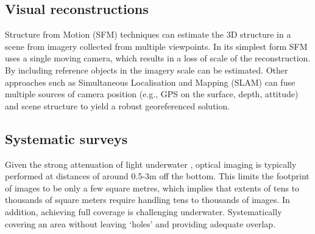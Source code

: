 \subsection{Visual reconstructions}
Structure from Motion (SFM) techniques \cite{Hartley_2004} can estimate the 3D structure in a scene from imagery collected from multiple viewpoints. In its simplest form SFM uses a single moving camera, which results in a loss of scale of the reconstruction. By including reference objects in the imagery scale can be estimated.
Other approaches such as Simultaneous Localisation and Mapping (SLAM) \cite{Thrun_2008} can fuse multiple sources of camera position (e.g., GPS on the surface, depth, attitude) and scene structure to yield a robust georeferenced solution.

\subsection{Systematic surveys}
Given the strong attenuation of light underwater \cite{DUNTLEY_1963}, optical imaging is typically performed at distances of around 0.5-3m off the bottom. This limits the footprint of images to be only a few square metres, which implies that extents of tens to thousands of square meters require handling tens to thousands of images. In addition, achieving full coverage is challenging underwater. Systematically covering an area without leaving `holes' and providing adequate overlap. 

